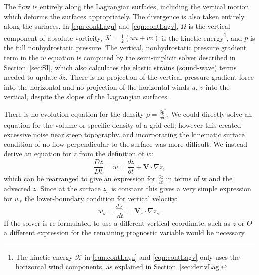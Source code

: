 \documentclass[10pt,letterpaper,margin=1in]{memoir}
\begin{document}
The flow is entirely along the Lagrangian surfaces, including the vertical motion which deforms the surfaces appropriately. The divergence is also taken entirely along the surfaces. In \eqref{eqn:contLagu} and \eqref{eqn:contLagv}, $\Omega$ is the vertical component of absolute vorticity,  $\mathcal{K} = \frac{1}{2} \left ( \widetilde{u}u + \widetilde{v}v \right )$ is the kinetic energy\footnote{The kinetic energy $\mathcal{K}$ in \eqref{eqn:contLagu} and \eqref{eqn:contLagv} only uses the horizontal wind components, as explained in Section~\ref{sec:derivLag}}, and $p$ is the full nonhydrostatic pressure. The vertical, nonhydrostatic pressure gradient term in the $w$ equation is computed by the semi-implicit solver described in Section~\ref{sec:SI}, which also calculates the elastic strains (sound-wave) terms needed to update $\delta z$. There is no projection of the vertical pressure gradient force into the horizontal and no projection of the horizontal winds $u$, $v$ into the vertical, despite the slopes of the Lagrangian surfaces.

There is no evolution equation for the density $\rho = \frac{\delta p^*}{g\delta z}$. We could directly solve an equation for the volume or specific density of a grid cell; however this created excessive noise near steep topography, and incorporating the kinematic surface condition of no flow perpendicular to the surface was more difficult. We instead derive an equation for $z$ from the definition of $w$:
\begin{equation} \label{eqn:z}
\frac{Dz}{Dt} = w = \frac{\partial z}{\partial t} + \mathbf{V} \cdot \nabla z,
\end{equation}
which can be rearranged to give an expression for $\frac{\partial z}{\partial t}$ in terms of w and the advected $z$.
Since at the surface $z_s$ is constant this gives a very simple expression for $w_s$ the lower-boundary condition for vertical velocity:
\begin{equation} \label{eqn:ws}
w_{s} = \frac{dz_s}{dt} = \mathbf{V}_{s} \cdot \nabla z_s.
\end{equation}
If the solver is re-formulated to use a different vertical coordinate, such as $z$ or $\Theta$ a different expression for the remaining prognostic variable would be necessary.
\end{document}
